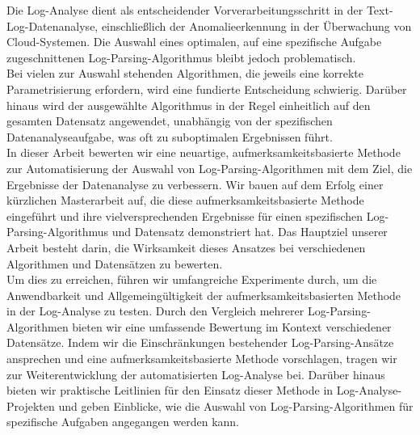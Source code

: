 
\Abstract

Die Log-Analyse dient als entscheidender Vorverarbeitungsschritt in der Text-Log-Datenanalyse, einschließlich der Anomalieerkennung in der Überwachung von Cloud-Systemen. Die Auswahl eines optimalen, auf eine spezifische Aufgabe zugeschnittenen Log-Parsing-Algorithmus bleibt jedoch problematisch.\\

Bei vielen zur Auswahl stehenden Algorithmen, die jeweils eine korrekte Parametrisierung erfordern, wird eine fundierte Entscheidung schwierig. Darüber hinaus wird der ausgewählte Algorithmus in der Regel einheitlich auf den gesamten Datensatz angewendet, unabhängig von der spezifischen Datenanalyseaufgabe, was oft zu suboptimalen Ergebnissen führt. \\

In dieser Arbeit bewerten wir eine neuartige, aufmerksamkeitsbasierte Methode zur Automatisierung der Auswahl von Log-Parsing-Algorithmen mit dem Ziel, die Ergebnisse der Datenanalyse zu verbessern. Wir bauen auf dem Erfolg einer kürzlichen Masterarbeit auf, die diese aufmerksamkeitsbasierte Methode eingeführt und ihre vielversprechenden Ergebnisse für einen spezifischen Log-Parsing-Algorithmus und Datensatz demonstriert hat. Das Hauptziel unserer Arbeit besteht darin, die Wirksamkeit dieses Ansatzes bei verschiedenen Algorithmen und Datensätzen zu bewerten. \\

Um dies zu erreichen, führen wir umfangreiche Experimente durch, um die Anwendbarkeit und Allgemeingültigkeit der aufmerksamkeitsbasierten Methode in der Log-Analyse zu testen. Durch den Vergleich mehrerer Log-Parsing-Algorithmen bieten wir eine umfassende Bewertung im Kontext verschiedener Datensätze. 
Indem wir die Einschränkungen bestehender Log-Parsing-Ansätze ansprechen und eine aufmerksamkeitsbasierte Methode vorschlagen, tragen wir zur Weiterentwicklung der automatisierten Log-Analyse bei. Darüber hinaus bieten wir praktische Leitlinien für den Einsatz dieser Methode in Log-Analyse-Projekten und geben Einblicke, wie die Auswahl von Log-Parsing-Algorithmen für spezifische Aufgaben angegangen werden kann.